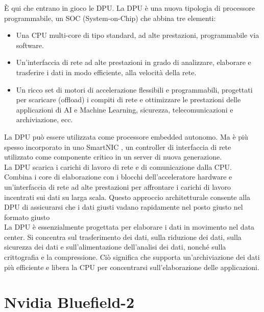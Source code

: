 \documentclass[binding=0.6cm]{sapthesis}
\theoremstyle{definition}
\begin{document}
È qui che entrano in gioco le DPU. 
La DPU è una nuova tipologia di processore programmabile, 
un SOC (System-on-Chip) che abbina tre elementi:
\begin{itemize}
    \item Una CPU multi-core di tipo standard, ad alte prestazioni, programmabile via software.
    \item Un’interfaccia di rete ad alte prestazioni in grado di analizzare, elaborare e trasferire i dati 
    in modo efficiente, alla velocità della rete.
    \item Un ricco set di motori di accelerazione flessibili e programmabili, progettati per scaricare 
    (offload) i compiti di rete e ottimizzare le prestazioni delle applicazioni di AI e Machine Learning, 
    sicurezza, telecomunicazioni e archiviazione, ecc.
\end{itemize}
La DPU può essere utilizzata come processore embedded autonomo. Ma è più spesso incorporato in uno SmartNIC , 
un controller di interfaccia di rete utilizzato come componente critico in un server di nuova generazione. 
\\La DPU scarica i carichi di lavoro di rete e di comunicazione dalla CPU. Combina i core di elaborazione con 
i blocchi dell'acceleratore hardware e un'interfaccia di rete ad alte prestazioni per affrontare i carichi di 
lavoro incentrati sui dati su larga scala. Questo approccio architetturale consente alla DPU di assicurarsi 
che i dati giusti vadano rapidamente nel posto giusto nel formato giusto
\\La DPU è essenzialmente progettata per elaborare i dati in movimento nel data center. 
Si concentra sul trasferimento dei dati, sulla riduzione dei dati, sulla sicurezza dei dati e 
sull'alimentazione dell'analisi dei dati, nonché sulla crittografia e la compressione. 
Ciò significa che supporta un'archiviazione dei dati più efficiente e libera la CPU per 
concentrarsi sull'elaborazione delle applicazioni. 

\section{Nvidia Bluefield-2}
\end{document}
